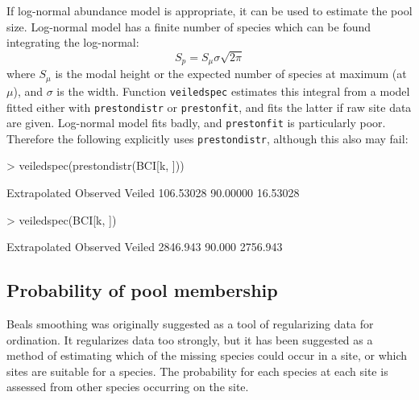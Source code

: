 \documentclass[a4paper,10pt]{amsart}
\begin{document}
If log-normal abundance model is appropriate, it can be used to
estimate the pool size.  Log-normal model has a finite number of
species which can be found integrating the log-normal:
\begin{equation}
S_p = S_\mu \sigma \sqrt{2 \pi}
\end{equation}
where $S_\mu$ is the modal height or the expected number of species at
maximum (at $\mu$), and $\sigma$ is the width.  Function
\texttt{veiledspec} estimates this integral from a model fitted either
with \texttt{prestondistr} or \texttt{prestonfit}, and fits the latter
if raw site data are given.  Log-normal model fits badly, and
\texttt{prestonfit} is particularly poor.  Therefore the following
explicitly uses \texttt{prestondistr}, although this also may fail:
\begin{Schunk}
\begin{Sinput}
> veiledspec(prestondistr(BCI[k, ]))
\end{Sinput}
\begin{Soutput}
Extrapolated     Observed       Veiled 
   106.53028     90.00000     16.53028 
\end{Soutput}
\begin{Sinput}
> veiledspec(BCI[k, ])
\end{Sinput}
\begin{Soutput}
Extrapolated     Observed       Veiled 
    2846.943       90.000     2756.943 
\end{Soutput}
\end{Schunk}

\subsection{Probability of pool membership}

Beals smoothing was originally suggested as a tool of regularizing data
for ordination.  It regularizes data too strongly,
but it has been suggested as a method of estimating which of the
missing species could occur in a site, or which sites are suitable for
a species.  The probability for each species at each site is assessed
from other species occurring on the site.
\end{document}
